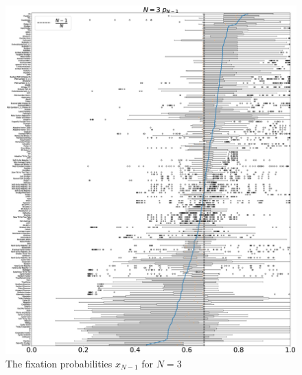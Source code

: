 \documentclass[10pt,letterpaper]{article}
\begin{document}
\begin{figure}[!hbtp]
    \centering
    \includegraphics[draft, width=\textwidth]{./Fig25.eps}
    \caption{The fixation probabilities \(x_{N-1}\) for \(N=3\)}
    \label{resistance-3}
\end{figure}
\end{document}
